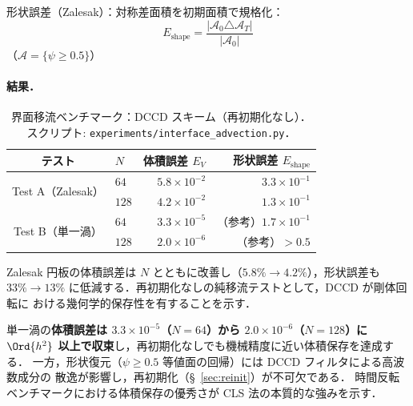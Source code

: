 形状誤差（Zalesak）：対称差面積を初期面積で規格化：
\begin{equation}
  E_\text{shape} = \frac{|\mathcal{A}_0 \triangle \mathcal{A}_T|}{|\mathcal{A}_0|}
  \label{eq:shape_err}
\end{equation}
（$\mathcal{A} = \{\psi \geq 0.5\}$）

\paragraph{結果．}

\begin{table}[htbp]
\centering
\caption{界面移流ベンチマーク：DCCD スキーム（再初期化なし）．
  スクリプト: \texttt{experiments/interface\_advection.py}．}
\label{tab:interface_advection}
\renewcommand{\arraystretch}{1.3}
\begin{tabular}{c l r r}
\toprule
テスト & $N$ & 体積誤差 $E_V$ & 形状誤差 $E_\text{shape}$ \\
\midrule
\multirow{2}{*}{Test A（Zalesak）}
  & $64$  & $5.8\times10^{-2}$ & $3.3\times10^{-1}$ \\
  & $128$ & $4.2\times10^{-2}$ & $1.3\times10^{-1}$ \\
\midrule
\multirow{2}{*}{Test B（単一渦）}
  & $64$  & $3.3\times10^{-5}$ & （参考）$1.7\times10^{-1}$ \\
  & $128$ & $2.0\times10^{-6}$ & （参考）$> 0.5$ \\
\bottomrule
\end{tabular}
\end{table}

\begin{tcolorbox}[resultbox, title={Test A 結果：Zalesak スロット円板}]
Zalesak 円板の体積誤差は $N$ とともに改善し（$5.8\% \to 4.2\%$），形状誤差も
$33\% \to 13\%$ に低減する．再初期化なしの純移流テストとして，DCCD が剛体回転に
おける幾何学的保存性を有することを示す．
\end{tcolorbox}

\begin{tcolorbox}[resultbox, title={Test B 結果：単一渦（体積保存）}]
単一渦の\textbf{体積誤差は $3.3\times10^{-5}$（$N=64$）から $2.0\times10^{-6}$（$N=128$）に
$\Ord{h^2}$ 以上で収束}し，再初期化なしでも機械精度に近い体積保存を達成する．
一方，形状復元（$\psi\geq 0.5$ 等値面の回帰）には DCCD フィルタによる高波数成分の
散逸が影響し，再初期化（§~\ref{sec:reinit}）が不可欠である．
時間反転ベンチマークにおける体積保存の優秀さが CLS 法の本質的な強みを示す．
\end{tcolorbox}
